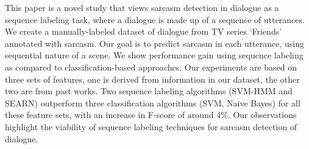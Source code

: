 This paper is a novel study that views sarcasm detection in dialogue as a sequence labeling task, where a dialogue is made up of a sequence of utterances. We create a manually-labeled dataset of dialogue from TV series `Friends' annotated with sarcasm. Our goal is to predict sarcasm in each utterance, using sequential nature of a scene. We show performance gain using sequence labeling as compared to classification-based approaches. Our experiments are based on three sets of features, one is derived from information in our dataset, the other two are from past works. Two sequence labeling algorithms (SVM-HMM and SEARN) outperform three classification algorithms (SVM, Naive Bayes) for all these feature sets, with an increase in F-score of around 4\%. Our observations highlight the viability of sequence labeling techniques for sarcasm detection of dialogue.
